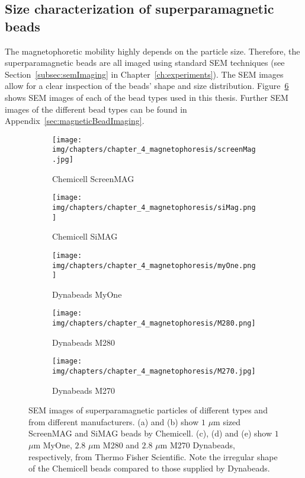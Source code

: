 \subsection{Size characterization of superparamagnetic beads}
The magnetophoretic mobility highly depends on the particle size. Therefore, the superparamagnetic beads are all imaged using standard SEM techniques (see Section~\ref{subsec:semImaging} in Chapter~\ref{ch:experiments}). The SEM images allow for a clear inspection of the beads' shape and size distribution. Figure~\ref{fig:semParticleImages} shows SEM images of each of the bead types used in this thesis. Further SEM images of the different bead types can be found in Appendix~\ref{sec:magneticBeadImaging}.

\begin{figure}
\begin{subfigure}[b]{0.48\linewidth}
\texttt{[image: img/chapters/chapter\_4\_magnetophoresis/screenMag.jpg]}
\caption{Chemicell ScreenMAG}\label{fig:semImage_ScreenMag}
\end{subfigure}
\hfill
\begin{subfigure}[b]{0.48\linewidth}
\texttt{[image: img/chapters/chapter\_4\_magnetophoresis/siMag.png]}
\caption{Chemicell SiMAG}\label{fig:semImage_SiMag}
\end{subfigure}
\begin{subfigure}[b]{0.48\linewidth}
\texttt{[image: img/chapters/chapter\_4\_magnetophoresis/myOne.png]}
\caption{Dynabeads MyOne}\label{fig:semImage_MyOne}
\end{subfigure}
\hfill
\begin{subfigure}[b]{0.48\linewidth}
\texttt{[image: img/chapters/chapter\_4\_magnetophoresis/M280.png]}
\caption{Dynabeads M280}\label{fig:semImage_M280}
\end{subfigure}
\begin{subfigure}[b]{0.48\linewidth}
\texttt{[image: img/chapters/chapter\_4\_magnetophoresis/M270.jpg]}
\caption{Dynabeads M270}\label{fig:semImage_M270}
\end{subfigure}
\caption[SEM images of different superparamagnetic particles]{SEM images of superparamagnetic particles of different types and from different manufacturers. (a) and (b) show $1$ $\mu$m sized ScreenMAG and SiMAG beads by Chemicell. (c), (d) and (e) show $1$ $\mu$m MyOne, $2.8$ $\mu$m M280 and $2.8$ $\mu$m M270 Dynabeads, respectively, from Thermo Fisher Scientific. Note the irregular shape of the Chemicell beads compared to those supplied by Dynabeads.}
\label{fig:semParticleImages}
\end{figure}


